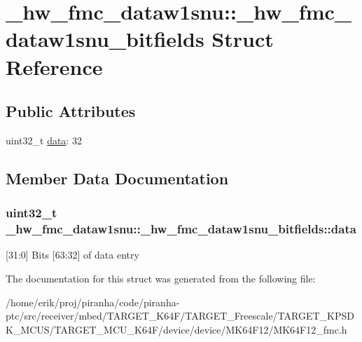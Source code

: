 \hypertarget{struct__hw__fmc__dataw1snu_1_1__hw__fmc__dataw1snu__bitfields}{}\section{\+\_\+hw\+\_\+fmc\+\_\+dataw1snu\+:\+:\+\_\+hw\+\_\+fmc\+\_\+dataw1snu\+\_\+bitfields Struct Reference}
\label{struct__hw__fmc__dataw1snu_1_1__hw__fmc__dataw1snu__bitfields}
\subsection*{Public Attributes}
\begin{DoxyCompactItemize}
\item 
uint32\+\_\+t \hyperlink{struct__hw__fmc__dataw1snu_1_1__hw__fmc__dataw1snu__bitfields_afa1b03b9f71c200150c6bf49587af51f}{data}\+: 32
\end{DoxyCompactItemize}


\subsection{Member Data Documentation}
\subsubsection[{\texorpdfstring{data}{data}}]{\setlength{\rightskip}{0pt plus 5cm}uint32\+\_\+t \+\_\+hw\+\_\+fmc\+\_\+dataw1snu\+::\+\_\+hw\+\_\+fmc\+\_\+dataw1snu\+\_\+bitfields\+::data}\hypertarget{struct__hw__fmc__dataw1snu_1_1__hw__fmc__dataw1snu__bitfields_afa1b03b9f71c200150c6bf49587af51f}{}\label{struct__hw__fmc__dataw1snu_1_1__hw__fmc__dataw1snu__bitfields_afa1b03b9f71c200150c6bf49587af51f}
\mbox{[}31\+:0\mbox{]} Bits \mbox{[}63\+:32\mbox{]} of data entry 

The documentation for this struct was generated from the following file\+:\begin{DoxyCompactItemize}
\item 
/home/erik/proj/piranha/code/piranha-\/ptc/src/receiver/mbed/\+T\+A\+R\+G\+E\+T\+\_\+\+K64\+F/\+T\+A\+R\+G\+E\+T\+\_\+\+Freescale/\+T\+A\+R\+G\+E\+T\+\_\+\+K\+P\+S\+D\+K\+\_\+\+M\+C\+U\+S/\+T\+A\+R\+G\+E\+T\+\_\+\+M\+C\+U\+\_\+\+K64\+F/device/device/\+M\+K64\+F12/M\+K64\+F12\+\_\+fmc.\+h\end{DoxyCompactItemize}
